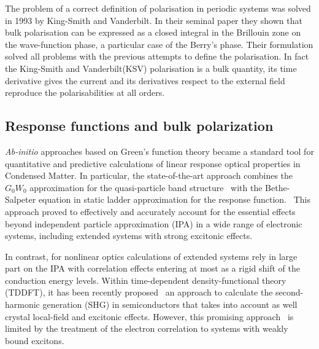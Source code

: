 The problem of a correct definition of polarisation in periodic systems was solved in 1993 by  King-Smith and Vanderbilt.\cite{KSV1} In their seminal paper they shown that  bulk polarisation can be expressed as a closed integral in the Brillouin zone on the wave-function phase, a particular case of the Berry's phase. Their formulation solved all problems with the previous attempts to define the polarisation. In fact the King-Smith and Vanderbilt(KSV) polarisation is a bulk quantity, its time derivative gives the current and its derivatives respect to the external field reproduce the polarisabilities at all orders.


\subsection{Response functions and bulk polarization}
\emph{Ab-initio} approaches based on Green's function theory became a standard tool for quantitative and predictive calculations of linear response optical properties in Condensed Matter. In particular, the state-of-the-art approach combines the $G_0W_0$ approximation for the quasi-particle band structure~\cite{aryasetiawan1998gw} with the Bethe-Salpeter equation in static ladder approximation for the response function.~\cite{strinati} This approach proved to effectively and accurately account for the essential effects beyond independent particle approximation (IPA) in a wide range of electronic systems, including extended systems with strong excitonic effects.~\cite{Onida}

In contrast, for nonlinear optics \ai calculations of extended systems rely in large part on the IPA\cite{PhysRevB.48.11705} with correlation effects entering at most as a rigid shift of the conduction energy levels\cite{PhysRevB.80.155205}.  Within time-dependent density-functional theory (TDDFT), it has been recently proposed~\cite{PhysRevB.82.235201} an approach to calculate the second-harmonic generation (SHG) in semiconductors that takes into account as well crystal local-field and excitonic effects. However, this promising approach~\cite{Cazzanelli2012} is limited by the treatment of the electron correlation to systems with weakly bound excitons.~\cite{LRC} 

